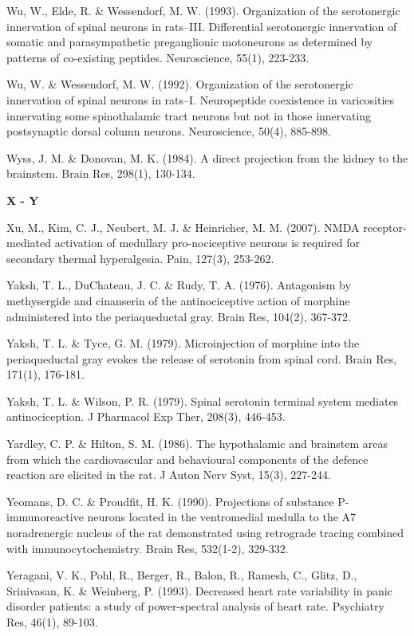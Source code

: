 \documentclass[a4paper,12pt,twoside]{report}
\begin{document}
\begin{singlespacing}
\begin{footnotesize}
Wu, W., Elde, R. \& Wessendorf, M. W. (1993). Organization of the serotonergic innervation of spinal neurons in rats--III. Differential serotonergic innervation of somatic and parasympathetic preganglionic motoneurons as determined by patterns of co-existing peptides. Neuroscience, 55(1), 223-233.

Wu, W. \& Wessendorf, M. W. (1992). Organization of the serotonergic innervation of spinal neurons in rats--I. Neuropeptide coexistence in varicosities innervating some spinothalamic tract neurons but not in those innervating postsynaptic dorsal column neurons. Neuroscience, 50(4), 885-898.

Wyss, J. M. \& Donovan, M. K. (1984). A direct projection from the kidney to the brainstem. Brain Res, 298(1), 130-134.

\medskip
\begin{Large}\textbf{X - Y}\end{Large}

Xu, M., Kim, C. J., Neubert, M. J. \& Heinricher, M. M. (2007). NMDA receptor-mediated activation of medullary pro-nociceptive neurons is required for secondary thermal hyperalgesia. Pain, 127(3), 253-262.

Yaksh, T. L., DuChateau, J. C. \& Rudy, T. A. (1976). Antagonism by methysergide and cinanserin of the antinociceptive action of morphine administered into the periaqueductal gray. Brain Res, 104(2), 367-372.

Yaksh, T. L. \& Tyce, G. M. (1979). Microinjection of morphine into the periaqueductal gray evokes the release of serotonin from spinal cord. Brain Res, 171(1), 176-181.

Yaksh, T. L. \& Wilson, P. R. (1979). Spinal serotonin terminal system mediates antinociception. J Pharmacol Exp Ther, 208(3), 446-453.

Yardley, C. P. \& Hilton, S. M. (1986). The hypothalamic and brainstem areas from which the cardiovascular and behavioural components of the defence reaction are elicited in the rat. J Auton Nerv Syst, 15(3), 227-244.

Yeomans, D. C. \& Proudfit, H. K. (1990). Projections of substance P-immunoreactive neurons located in the ventromedial medulla to the A7 noradrenergic nucleus of the rat demonstrated using retrograde tracing combined with immunocytochemistry. Brain Res, 532(1-2), 329-332.

Yeragani, V. K., Pohl, R., Berger, R., Balon, R., Ramesh, C., Glitz, D., Srinivasan, K. \& Weinberg, P. (1993). Decreased heart rate variability in panic disorder patients: a study of power-spectral analysis of heart rate. Psychiatry Res, 46(1), 89-103.


\end{footnotesize}
\end{singlespacing}
\end{document}
